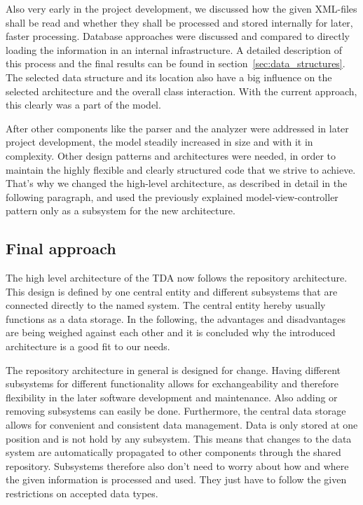 Also very early in the project development, we discussed how the given XML-files shall be read and whether they shall be processed and stored internally for later, faster processing. Database approaches were discussed and compared to directly loading the information in an internal infrastructure. A detailed description of this process and the final results can be found in section~\ref{sec:data_structures}.
The selected data structure and its location also have a big influence on the selected architecture and the overall class interaction. With the current approach, this clearly was a part of the model.

After other components like the parser and the analyzer were addressed in later project development, the model steadily increased in size and with it in complexity. Other design patterns and architectures were needed, in order to maintain the highly flexible and clearly structured code that we strive to achieve. That's why we changed the high-level architecture, as described in detail in the following paragraph, and used the previously explained model-view-controller pattern only as a subsystem for the new architecture.

\subsection{Final approach}
The high level architecture of the TDA now follows the repository architecture. This design is defined by one central entity and different subsystems that are connected directly to the named system. The central entity hereby usually functions as a data storage. In the following, the advantages and disadvantages are being weighed against each other and it is concluded why the introduced architecture is a good fit to our needs.

The repository architecture in general is designed for change. Having different subsystems for different functionality allows for exchangeability and therefore flexibility in the later software development and maintenance. Also adding or removing subsystems can easily be done. Furthermore, the central data storage allows for convenient and consistent data management. Data is only stored at one position and is not hold by any subsystem. This means that changes to the data system are automatically propagated to other components through the shared repository. Subsystems therefore also don't need to worry about how and where the given information is processed and used. They just have to follow the given restrictions on accepted data types.


